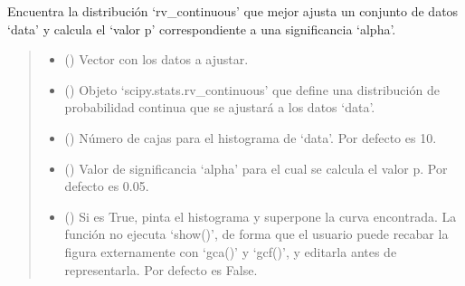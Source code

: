 \documentclass[letterpaper,10pt,english]{sphinxmanual}
\begin{document}
\begin{fulllineitems}
\label{\detokenize{utils.stats:utils.stats.fit_rv_cont}}
\pysigstartsignatures
{}
\pysigstopsignatures
\sphinxAtStartPar
Encuentra la distribución ‘rv\_continuous’ que mejor ajusta un conjunto de datos ‘data’ y calcula el ‘valor p’ correspondiente a una significancia ‘alpha’.
\begin{quote}\begin{description}
\begin{itemize}
\item {} 
\sphinxAtStartPar
{} () \textendash{} Vector con los datos a ajustar.

\item {} 
\sphinxAtStartPar
{} () \textendash{} Objeto ‘scipy.stats.rv\_continuous’ que define una distribución de probabilidad continua que se ajustará a los datos ‘data’.

\item {} 
\sphinxAtStartPar
{} (\sphinxstyleliteralemphasis{\sphinxupquote{, }}) \textendash{} Número de cajas para el histograma de ‘data’. Por defecto es 10.

\item {} 
\sphinxAtStartPar
{} (\sphinxstyleliteralemphasis{\sphinxupquote{, }}) \textendash{} Valor de significancia ‘alpha’ para el cual se calcula el valor p. Por defecto es 0.05.

\item {} 
\sphinxAtStartPar
{} (\sphinxstyleliteralemphasis{\sphinxupquote{, }}) \textendash{} Si es True, pinta el histograma y superpone la curva encontrada. La función no ejecuta ‘show()’, de forma que el usuario puede recabar la figura externamente
con ‘gca()’ y ‘gcf()’, y editarla antes de representarla. Por defecto es False.


\end{itemize}
\end{description}
\end{quote}
\end{fulllineitems}
\end{document}
